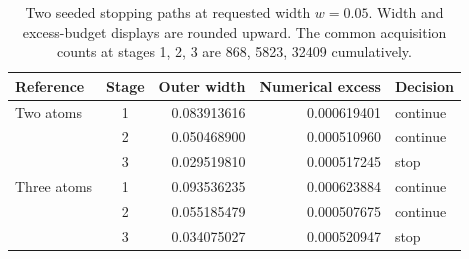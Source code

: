 \begin{table}[tb]
\centering
\caption{Two seeded stopping paths at requested width $w=0.05$. Width and excess-budget displays are rounded upward. The common acquisition counts at stages 1, 2, 3 are 868, 5823, 32409 cumulatively.}\label{tab:stopping}
\begin{tabular}{lcrrl}\toprule
Reference & Stage & Outer width & Numerical excess & Decision\\\midrule
Two atoms & 1 & 0.083913616 & 0.000619401 & continue\\
 & 2 & 0.050468900 & 0.000510960 & continue\\
 & 3 & 0.029519810 & 0.000517245 & stop\\
Three atoms & 1 & 0.093536235 & 0.000623884 & continue\\
 & 2 & 0.055185479 & 0.000507675 & continue\\
 & 3 & 0.034075027 & 0.000520947 & stop\\
\bottomrule\end{tabular}
\end{table}
